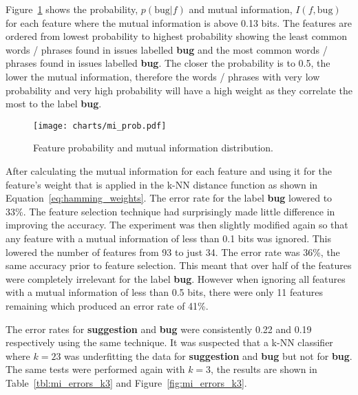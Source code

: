 Figure~\ref{fig:mi_prob} shows the probability, $p(\mathrm{bug}|f)$ and mutual information, $I(f,\mathrm{bug})$ for each feature
where the mutual information is above 0.13 bits. The features are ordered from lowest probability to highest probability showing
the least common words / phrases found in issues labelled \textbf{bug} and the most common words / phrases found in issues
labelled \textbf{bug}. The closer the probability is to 0.5, the lower the mutual information, therefore the words / phrases
with very low probability and very high probability will have a high weight as they correlate the most to the label
\textbf{bug}.
\begin{figure}[h]
	\centering
	\texttt{[image: charts/mi\_prob.pdf]}
	\label{fig:mi_prob}
	\caption{Feature probability and mutual information distribution.}
\end{figure}

After calculating the mutual information for each feature and using it for the feature's weight that is applied in the k-NN
distance function as shown in Equation~\ref{eq:hamming_weights}. The error rate for the label \textbf{bug} lowered to 33\%. The
feature selection technique had surprisingly made little difference in improving the accuracy. The experiment was then slightly
modified again so that any feature with a mutual information of less than 0.1 bits was ignored. This lowered the number of
features from 93 to just 34. The error rate was 36\%, the same accuracy prior to feature selection. This meant that over half of
the features were completely irrelevant for the label \textbf{bug}. However when ignoring all features with a mutual information
of less than 0.5 bits, there were only 11 features remaining which produced an error rate of 41\%.

The error rates for \textbf{suggestion} and \textbf{bug} were consistently 0.22 and 0.19 respectively using the same technique.
It was suspected that a k-NN classifier where $k = 23$ was underfitting the data for \textbf{suggestion} and \textbf{bug} but
not for \textbf{bug}. The same tests were performed again with $k = 3$, the results are shown in Table~\ref{tbl:mi_errors_k3}
and Figure~\ref{fig:mi_errors_k3}.

